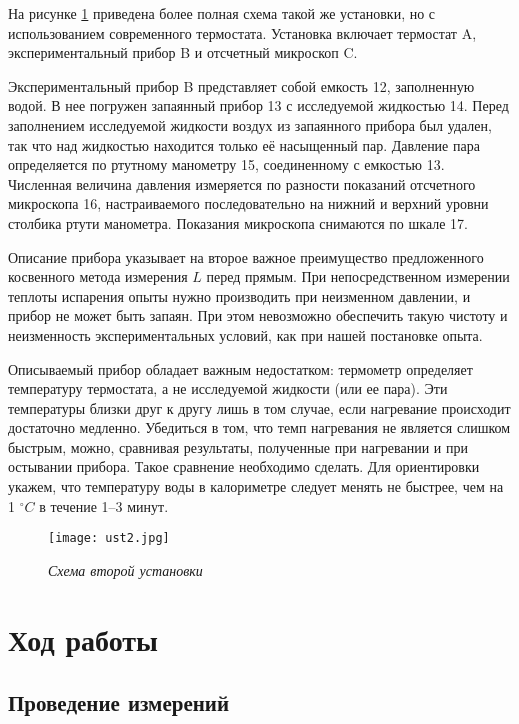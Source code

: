 \documentclass[a4paper,12pt]{article} %
\begin{document}
На рисунке \ref{img2} приведена более полная схема такой же установки, но с использованием современного термостата. Установка включает термостат A, экспериментальный прибор B и отсчетный микроскоп C.

Экспериментальный прибор B представляет собой емкость 12, заполненную водой. В нее погружен запаянный прибор 13 с исследуемой жидкостью 14. Перед заполнением исследуемой жидкости воздух из запаянного прибора был удален, так что над жидкостью находится только её насыщенный пар. Давление пара определяется по ртутному манометру 15, соединенному с емкостью 13. Численная величина давления измеряется по разности показаний отсчетного микроскопа 16, настраиваемого последовательно на нижний и верхний уровни столбика ртути манометра. Показания микроскопа снимаются по шкале 17.

Описание прибора указывает на второе важное преимущество предложенного косвенного метода измерения $ L $ перед прямым. При непосредственном измерении теплоты испарения опыты нужно производить при неизменном давлении, и прибор не может быть запаян. При этом невозможно обеспечить такую чистоту и неизменность экспериментальных условий, как при нашей постановке опыта.

Описываемый прибор обладает важным недостатком: термометр определяет температуру термостата, а не исследуемой жидкости (или ее пара). Эти температуры близки друг к другу лишь в том случае, если нагревание происходит достаточно медленно. Убедиться в том, что темп нагревания не является слишком быстрым, можно, сравнивая результаты, полученные при нагревании и при остывании прибора. Такое сравнение необходимо сделать. Для ориентировки укажем, что температуру воды в калориметре следует менять не быстрее, чем на 1 $ ^\circ C $ в течение 1–3 минут.

\begin{figure}[H]
\begin{center}
		\texttt{[image: ust2.jpg]}
\end{center}
	\caption{\textit{Схема второй установки}}
	\label{img2}
\end{figure}

\section{Ход работы}

\subsection{Проведение измерений}
\end{document}
